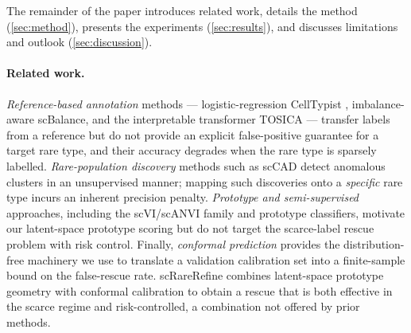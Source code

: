 The remainder of the paper introduces related work, details the method (\cref{sec:method}), presents the
experiments (\cref{sec:results}), and discusses limitations and outlook (\cref{sec:discussion}).

\paragraph{Related work.}
\emph{Reference-based annotation} methods --- logistic-regression CellTypist \citep{dominguez2022celltypist},
imbalance-aware scBalance, and the interpretable transformer TOSICA \citep{chen2023tosica} --- transfer labels from a
reference but do not provide an explicit false-positive guarantee for a target rare type, and their accuracy degrades
when the rare type is sparsely labelled. \emph{Rare-population discovery} methods such as scCAD detect anomalous
clusters in an unsupervised manner; mapping such discoveries onto a \emph{specific} rare type incurs an inherent
precision penalty. \emph{Prototype and semi-supervised} approaches, including the scVI/scANVI family
\citep{lopez2018scvi,xu2021scanvi} and prototype classifiers, motivate our latent-space prototype scoring but do not
target the scarce-label rescue problem with risk control. Finally, \emph{conformal prediction}
\citep{vovk2005algorithmic,angelopoulos2023conformal} provides the distribution-free machinery we use to translate a
validation calibration set into a finite-sample bound on the false-rescue rate. scRareRefine combines latent-space
prototype geometry with conformal calibration to obtain a rescue that is both effective in the scarce regime and
risk-controlled, a combination not offered by prior methods.
